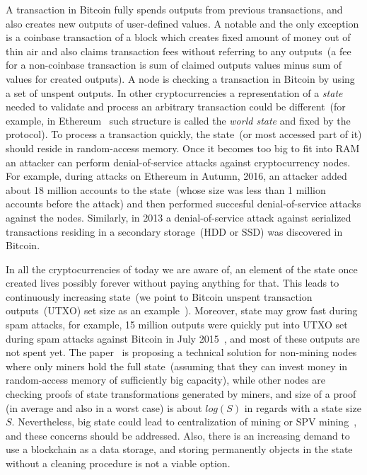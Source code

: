 \documentclass[]{llncs}   %
\begin{document}
A transaction in Bitcoin fully spends outputs from previous transactions, and
also creates new outputs of user-defined values. A notable and the only
exception is a coinbase transaction of a block which creates fixed amount of
money out of thin air and also claims transaction fees without referring to any
outputs~(a fee for a non-coinbase transaction is sum of claimed outputs values
minus sum of values for created outputs). A node is checking a transaction in
Bitcoin by using a set of unspent outputs. In other cryptocurrencies a
representation of a {\em state} needed to validate and process an arbitrary
transaction could be different~(for example, in Ethereum~\cite{ethyp} such
structure is called the {\em world state} and fixed by the protocol). To process
a transaction quickly, the state~(or most accessed part of it) should reside in
random-access memory. Once it becomes too big to fit into RAM an attacker can
perform denial-of-service attacks against cryptocurrency nodes. For example,
during attacks on Ethereum in Autumn, 2016, an attacker added about 18 million
accounts to the state~(whose size was less than 1 million accounts before the
attack) and then performed succesful denial-of-service attacks against the
nodes\cite{eth2016dos}. Similarly, in 2013 a denial-of-service attack against
serialized transactions residing in a secondary storage~(HDD or SSD) was
discovered in Bitcoin\cite{vasek2014empirical}.

In all the cryptocurrencies of today we are aware of, an element of the state once created 
lives possibly forever without paying anything for that. This leads to continuously increasing state~(we point
to Bitcoin unspent transaction outputs~(UTXO) set size as an
example~\cite{utxoChart}). Moreover, state may grow fast during spam attacks, for
example, 15 million outputs were quickly put into UTXO set during spam attacks
against Bitcoin in July 2015~\cite{bitcoin2015flood}, and most of these outputs
are not spent yet. The paper~\cite{reyzin2016improving} is proposing a technical
solution for non-mining nodes where only miners hold the full state~(assuming
that they can invest money in  random-access memory of sufficiently big
capacity), while other nodes are checking proofs of state transformations
generated by miners, and size of a proof (in average and also in a worst case)
is about $log(S)$ in regards with a state size $S$. Nevertheless, big state
could lead to centralization of mining or SPV mining~\cite{spvMining}, and these
concerns should be addressed. Also, there is an increasing demand to use a
blockchain as a data storage, and storing permanently objects in the state
without a cleaning procedure is not a viable option.
\end{document}
